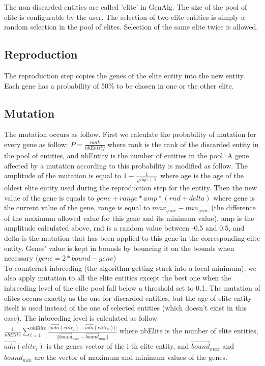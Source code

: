 The non discarded entities are called 'elite' in GenAlg. The size of the pool of elite is configurable by the user. The selection of two elite entities is simply a random selection in the pool of elites. Selection of the same elite twice is allowed.\\

\subsection{Reproduction}

The reproduction step copies the genes of the elite entity into the new entity. Each gene has a probability of 50\% to be chosen in one or the other elite.\\

\subsection{Mutation}

The mutation occurs as follow. First we calculate the probability of mutation for every gene as follow: $P=\frac{rank}{nbEntity}$ where rank is the rank of the discarded entity in the pool of entities, and nbEntity is the number of entities in the pool. A gene affected by a mutation according to this probability is modified as follow. The amplitude of the mutation is equal to $1-\frac{1}{\sqrt{age+1}}$ where age is the age of the oldest elite entity used during the reproduction step for the entity. Then the new value of the gene is equals to $gene+range*amp*(rnd+delta)$ where gene is the current value of the gene, range is equal to $max_{gene}-min_{gene}$ (the difference of the maximum allowed value for this gene and its minimum value), amp is the amplitude calculated above, rnd is a random value between -0.5 and 0.5, and delta is the mutation that has been applied to this gene in the corresponding elite entity. Genes' value is kept in bounds by bouncing it on the bounds when necessary ($gene=2*bound-gene$)\\

To counteract inbreeding (the algorithm getting stuck into a local minimum), we also apply mutation to all the elite entities except the best one when the inbreeding level of the elite pool fall below a threshold set to 0.1. The mutation of elites occurs exactly as the one for discarded entities, but the age of elite entity itself is used instead of the one of selected entities (which doesn't exist in this case). The inbreeding level is calculated as follow $\frac{1}{nbElite}\sum_{i=1}^{nbElite}\frac{||\overrightarrow{adn}(elite_i)-\overrightarrow{adn}(elite_0)||}{||\overrightarrow{bound}_{max}-\overrightarrow{bound}_{min}||}$ where nbElite is the number of elite entities, $\overrightarrow{adn}(elite_i)$ is the genes vector of the i-th elite entity, and $\overrightarrow{bound}_{max}$ and $\overrightarrow{bound}_{min}$ are the vector of maximum and minimum values of the genes.\\ 

